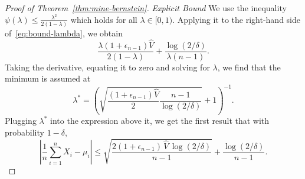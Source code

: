 \documentclass[aos]{imsart2}
\theoremstyle{plain}
\theoremstyle{definition}
\newcommand{\vh}{\hat{V}}
\begin{document}
\begin{appendix}
\begin{proof}[Proof of Theorem~\ref{thm:mine-bernstein}]
    \textit{Explicit Bound} We use the inequality $\psi(\lambda) \leq \frac{\lambda^2}{2(1-\lambda)}$ which holds for all $\lambda \in [0,1)$. Applying it to the right-hand side of~\eqref{eq:bound-lambda}, we obtain
    \begin{equation*}
        \frac{\lambda(1+\epsilon_{n-1})\vh}{2(1-\lambda)} + \frac{\log(2/\delta)}{\lambda(n-1)}.
    \end{equation*}
    Taking the derivative, equating it to zero and solving for $\lambda$, we find that the minimum is assumed at
    \begin{equation*}
        \lambda^* = \left(\sqrt{\frac{(1+\epsilon_{n-1})\vh}{2} \frac{n-1}{\log(2/\delta)}}+1\right)^{-1}.
    \end{equation*}
    Plugging $\lambda^*$ into the expression above it, we get the first result that with probability $1-\delta$,
    \begin{equation*}
        \left\vert\frac{1}{n}\sum_{i=1}^n X_i - \mu_i\right\vert \leq\sqrt{\frac{2(1+\epsilon_{n-1})\,\vh \,\log(2/\delta)}{n-1}} + \frac{\log(2/\delta)}{n-1}.
    \end{equation*}


\end{proof}
\end{appendix}
\end{document}
